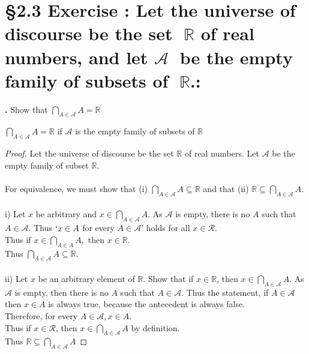 \documentclass[a4paper,11pt]{article}
\begin{document}
\section*{\S 2.3 Exercise : Let the universe of discourse be the set \(\mathbb{R}\) of real numbers, and let \(\mathscr{A}\) be the
empty family of subsets of \(\mathbb{R}\).:}
\textbf{.}
Show that \(\bigcap\limits_{A\in\mathscr{A}}A=\mathbb{R}\)
\begin{theorem2}
\(\bigcap\limits_{A\in\mathscr{A}}A=\mathbb{R}\) if \(\mathscr{A}\) is the empty 
family of subsets of \(\mathbb{R}\)
   \begin{proof}
    Let the universe of discourse be the set \(\mathbb{R}\) of real numbers. Let 
    \(\mathscr{A}\) be the empty family of subset \(\mathbb{R}\).\\\\
    For equivalence, we must show that (i) \(\bigcap\limits_{A \in \mathscr{A}}A \subseteq \mathbb{R}\) and that (ii) \(\mathbb{R} \subseteq \bigcap\limits_{A \in 
    \mathscr{A}}A\).\\\\
    i) Let \(x\) be arbitrary and \(x \in \bigcap\limits_{A \in \mathscr{A}}A\). As \(\mathscr{A}\) 
    is empty, there is no \(A\) such that \(A \in \mathscr{A}\). Thus \(`x \in A\) for every \(A \in \mathscr{A}\)' holds for all \(x \in \mathscr{R}\).\\
    Thus if \(x \in \bigcap\limits_{A \in A}A, \text{ then } x \in \mathbb{R}\).\\
    Thus \(\bigcap\limits_{A \in \mathscr{A}}A \subseteq \mathbb{R}\).\\\\
    ii) Let \(x\) be an arbitrary element of \(\mathbb{R}\). Show that if \(x \in 
    \mathbb{R}\), then \(x \in \bigcap\limits_{A \in \mathscr{A}}A\).
    As \(\mathscr{A}\) is empty, then there is no \(A\) such that \(A \in \mathscr{A}\).
    Thus the statement, if \(A \in \mathscr{A}\) then \(x \in A\) is always 
    true, because the antecedent is always false.\\
    Therefore, for every \(A \in \mathscr{A}, x \in A\).\\
    Thus if \(x \in \mathscr{R}\), then \(x \in \bigcap\limits_{A \in \mathscr{A}}A\) 
    by definition.\\
    Thus \(\mathbb{R} \subseteq \bigcap\limits_{A \in \mathscr{A}}A\)
  \end{proof}
\end{theorem2}
\end{document}
